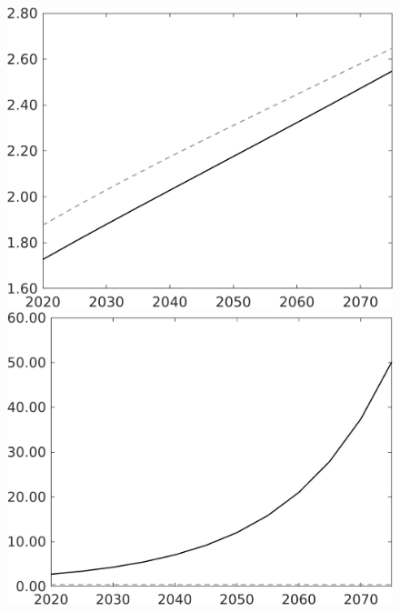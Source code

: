 \documentclass[12pt]{article}
\begin{document}
\begin{figure}[h!!]
\begin{minipage}[]{0.32\textwidth}
\end{minipage}	
\begin{minipage}[]{0.32\textwidth}
\includegraphics[width=1\textwidth]{../../codding_model/own_basedOnFried/optimalPol_010922_revision/figures/all_13Sept22/LevTaufNoTauf_TaulCalib_Equlab_regime0_N_spillover0_nsk1_xgr1_knspil1_sep1_LFlimit0_emsbase0_countec0_GovRev0_etaa0.79_lgd0.png}
\end{minipage}	
\begin{minipage}[]{0.32\textwidth}
\includegraphics[width=1\textwidth]{../../codding_model/own_basedOnFried/optimalPol_010922_revision/figures/all_13Sept22/LevTaufNoTauf_TaulCalib_Equlab_regime0_LgLf_spillover0_nsk1_xgr1_knspil1_sep1_LFlimit0_emsbase0_countec0_GovRev0_etaa0.79_lgd0.png}
\end{minipage}	
\end{figure}
\end{document}
